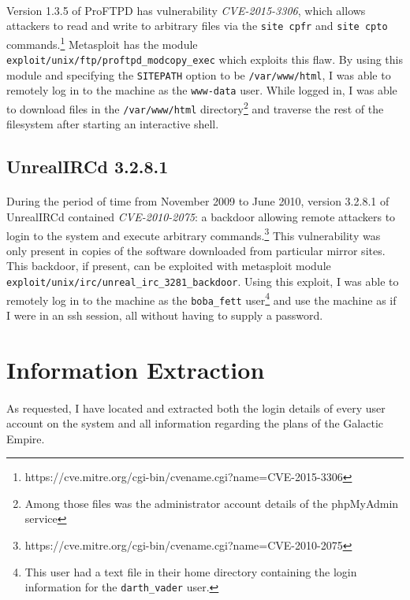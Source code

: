\documentclass{article}
\begin{document}
\paragraph{}
Version 1.3.5 of ProFTPD has vulnerability \emph{CVE-2015-3306}, which allows attackers to read and write to arbitrary files via the \texttt{site cpfr} and \texttt{site cpto} commands.\footnote{https://cve.mitre.org/cgi-bin/cvename.cgi?name=CVE-2015-3306}
Metasploit has the module \texttt{exploit/unix/ftp/proftpd\_modcopy\_exec} which exploits this flaw.
By using this module and specifying the \texttt{SITEPATH} option to be \texttt{/var/www/html}, I was able to remotely log in to the machine as the \texttt{www-data} user.
While logged in, I was able to download files in the \texttt{/var/www/html} directory\footnote{Among those files was the administrator account details of the phpMyAdmin service} and traverse the rest of the filesystem after starting an interactive shell.

\subsection{UnrealIRCd 3.2.8.1}
\paragraph{}
During the period of time from November 2009 to June 2010, version 3.2.8.1 of UnrealIRCd contained \emph{CVE-2010-2075}: a backdoor allowing remote attackers to login to the system and execute arbitrary commands.\footnote{https://cve.mitre.org/cgi-bin/cvename.cgi?name=CVE-2010-2075}
This vulnerability was only present in copies of the software downloaded from particular mirror sites.
This backdoor, if present, can be exploited with metasploit module \texttt{exploit/unix/irc/unreal\_irc\_3281\_backdoor}.
Using this exploit, I was able to remotely log in to the machine as the \texttt{boba\_fett} user\footnote{This user had a text file in their home directory containing the login information for the \texttt{darth\_vader} user.} and use the machine as if I were in an ssh session, all without having to supply a password.

\newpage

\section{Information Extraction}
\paragraph{}
As requested, I have located and extracted both the login details of every user account on the system and all information regarding the plans of the Galactic Empire.
\end{document}
